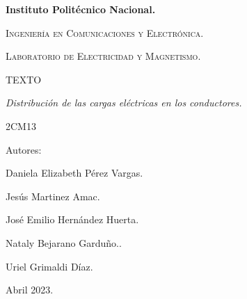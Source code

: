 \documentclass[spanish,10pt,a4paper,onecolumn]{article}
\begin{document}
\pagestyle{fancy}
\cfoot{}


\lhead{}

\begin{titlepage}

	\begin{figure}[t]
		\hspace{0.6\textwidth}
	\end{figure}

	\centering
	{\bfseries\Huge Instituto Politécnico Nacional. \par}
	\vspace{1cm}
	{\scshape\Large Ingeniería en Comunicaciones y Electrónica. \par}
	\vspace{0.3cm}
	{\scshape\Large Laboratorio de Electricidad y Magnetismo.  \par}
	\vspace{1cm}
	{\scshape\Huge TEXTO \par}
	\vspace{1cm}
	{\itshape\Large Distribución de las cargas eléctricas en los conductores. \par}
	{\Large 2CM13\par}
	\vfill
	{\Large Autores: \par}
	{\Large Daniela Elizabeth Pérez Vargas. \par}
	{\Large Jesús Martinez Amac. \par}
	{\Large José Emilio Hernández Huerta. \par}
	{\Large Nataly Bejarano Garduño..\par}
	{\Large Uriel Grimaldi Díaz.  \par}
	\vfill
	{\Large Abril 2023. \par}

\end{titlepage}
\end{document}
